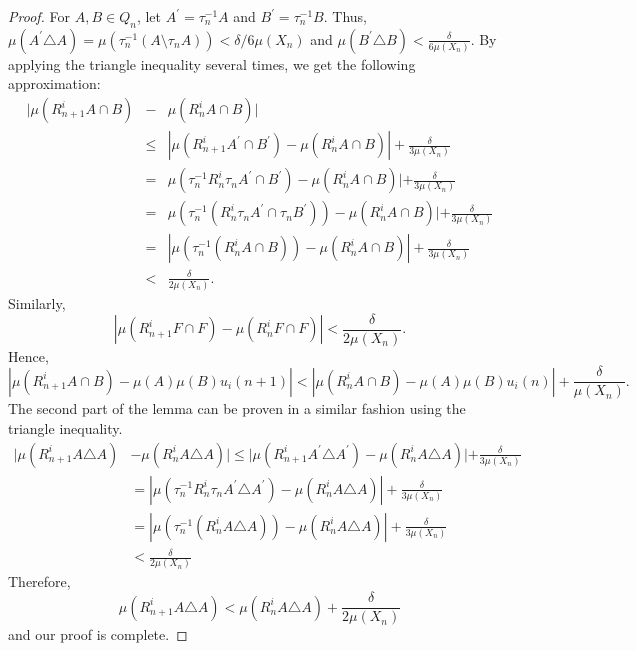 \documentclass[12pt]{amsart}
\begin{document}
\begin{proof} 
For $A,B\in Q_n$, let $A^{\prime}= \tau_n^{-1} A$ and 
$B^{\prime}=\tau_n^{-1} B$. 
Thus, 
$\mu(A^{\prime}\triangle A) = \mu(\tau_n^{-1}(A\setminus \tau_nA)) < {\delta} / {6\mu (X_n)}$ 
and $\mu (B^{\prime}\triangle B)<\frac{\delta}{6\mu (X_n)}$. 
By applying the triangle inequality several times, we get the following approximation: 
\begin{eqnarray*} 
| \mu (R_{n+1}^iA\cap B) &-& \mu(R_n^i A \cap B) | \\ 
&\leq& | \mu (R_{n+1}^iA^{\prime}\cap B^{\prime}) - \mu(R_n^i A \cap B) | 
+ \frac{\delta}{3\mu (X_n)} \\ 
&=& \mu (\tau_n^{-1}R_{n}^i\tau_nA^{\prime}\cap B^{\prime}) - \mu(R_n^i A \cap B) | + \frac{\delta}{3\mu (X_n)} \\ 
&=& \mu (\tau_n^{-1}(R_{n}^i\tau_nA^{\prime} \cap \tau_n B^{\prime})) - \mu(R_n^i A \cap B) | + \frac{\delta}{3\mu (X_n)} \\ 
&=& | \mu( \tau_n^{-1}(R_n^i A \cap B)) - \mu(R_n^i A \cap B) | + \frac{\delta}{3\mu (X_n)} \\ 
&<& \frac{\delta}{2\mu (X_n)} . 
\end{eqnarray*}
Similarly, 
$$
| \mu (R_{n+1}^iF\cap F) - \mu(R_n^i F \cap F) | < \frac{\delta}{2\mu (X_n)} . 
$$
Hence, 
$$|\mu (R_{n+1}^iA\cap B)-\mu (A)\mu (B)u_i(n+1)| < |\mu (R_{n}^iA\cap B)-\mu (A)\mu (B)u_i(n)| + 
\frac{\delta}{\mu (X_n)}.$$
The second part of the lemma can be proven in a similar fashion using the triangle inequality. 
\begin{align*}
| \mu(R_{n+1}^iA\triangle A) & - \mu (R_{n}^iA\triangle A) | \leq
| \mu (R_{n+1}^iA^{\prime}\triangle A^{\prime}) - \mu (R_{n}^iA\triangle A) | + \frac{\delta}{3\mu (X_n)} \\ 
&= | \mu (\tau_n^{-1}R_n^i \tau_nA^{\prime}\triangle A^{\prime}) - \mu (R_{n}^iA\triangle A) | + \frac{\delta}{3\mu (X_n)} \\ 
&= | \mu (\tau_n^{-1} (R_n^i A \triangle A)) - \mu (R_n^i A \triangle A) | + \frac{\delta}{3\mu (X_n)} \\ 
&< \frac{\delta}{2\mu (X_n)} 
\end{align*}
Therefore, 
$$\mu(R_{n+1}^iA\triangle A) < \mu(R_{n}^iA\triangle A) + \frac{\delta}{2\mu (X_n)}$$ 
and our proof is complete. 
\end{proof}
\end{document}
